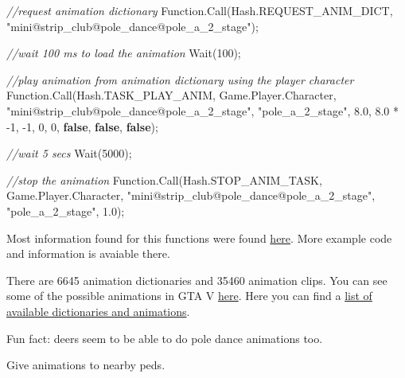 \documentclass[
  openany]{book}
\newenvironment{Shaded}{\begin{snugshade}}{\end{snugshade}}
\newcommand{\CommentTok}[1]{\textcolor[rgb]{0.56,0.35,0.01}{\textit{#1}}}
\newcommand{\DecValTok}[1]{\textcolor[rgb]{0.00,0.00,0.81}{#1}}
\newcommand{\FloatTok}[1]{\textcolor[rgb]{0.00,0.00,0.81}{#1}}
\newcommand{\FunctionTok}[1]{\textcolor[rgb]{0.00,0.00,0.00}{#1}}
\newcommand{\KeywordTok}[1]{\textcolor[rgb]{0.13,0.29,0.53}{\textbf{#1}}}
\newcommand{\NormalTok}[1]{#1}
\newcommand{\StringTok}[1]{\textcolor[rgb]{0.31,0.60,0.02}{#1}}
\begin{document}
\begin{Shaded}
\begin{Highlighting}[]
\CommentTok{//request animation dictionary}
\NormalTok{Function.}\FunctionTok{Call}\NormalTok{(Hash.}\FunctionTok{REQUEST_ANIM_DICT}\NormalTok{, }\StringTok{"mini@strip_club@pole_dance@pole_a_2_stage"}\NormalTok{);}
 
\CommentTok{//wait 100 ms to load the animation}
\FunctionTok{Wait}\NormalTok{(}\DecValTok{100}\NormalTok{);}
 
\CommentTok{//play animation from animation dictionary using the player character}
\NormalTok{Function.}\FunctionTok{Call}\NormalTok{(Hash.}\FunctionTok{TASK_PLAY_ANIM}\NormalTok{, Game.}\FunctionTok{Player}\NormalTok{.}\FunctionTok{Character}\NormalTok{, }\StringTok{"mini@strip_club@pole_dance@pole_a_2_stage"}\NormalTok{, }\StringTok{"pole_a_2_stage"}\NormalTok{, }\FloatTok{8.0}\NormalTok{, }\FloatTok{8.0}\NormalTok{ * }\DecValTok{-1}\NormalTok{, }\DecValTok{-1}\NormalTok{, }\DecValTok{0}\NormalTok{, }\DecValTok{0}\NormalTok{, }\KeywordTok{false}\NormalTok{, }\KeywordTok{false}\NormalTok{, }\KeywordTok{false}\NormalTok{);}
 
\CommentTok{//wait 5 secs}
\FunctionTok{Wait}\NormalTok{(}\DecValTok{5000}\NormalTok{);}
 
\CommentTok{//stop the animation}
\NormalTok{Function.}\FunctionTok{Call}\NormalTok{(Hash.}\FunctionTok{STOP_ANIM_TASK}\NormalTok{, Game.}\FunctionTok{Player}\NormalTok{.}\FunctionTok{Character}\NormalTok{, }\StringTok{"mini@strip_club@pole_dance@pole_a_2_stage"}\NormalTok{, }\StringTok{"pole_a_2_stage"}\NormalTok{, }\FloatTok{1.0}\NormalTok{);}
\end{Highlighting}
\end{Shaded}

Most information found for this functions were found \href{Source:\%20http://gtaxscripting.blogspot.com/2016/06/tut-gta-v-playing-and-handling.html}{here}. More example code and information is avaiable there.

There are 6645 animation dictionaries and 35460 animation clips. You can see some of the possible animations in GTA V \href{https://www.youtube.com/playlist?list=PLFy_1HUkWwEAgPtwtjjLYpKCbBiwXamST}{here}.
Here you can find a \href{https://docs.ragepluginhook.net/html/62951c37-a440-478c-b389-c471230ddfc5.htm}{list of available dictionaries and animations}.

Fun fact: deers seem to be able to do pole dance animations too.

Give animations to nearby peds.
\end{document}
